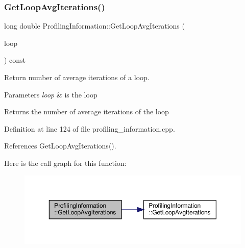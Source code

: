 \subsubsection{\texorpdfstring{Get\+Loop\+Avg\+Iterations()}{GetLoopAvgIterations()}\hspace{0.1cm}{\footnotesize\ttfamily [2/2]}}
{\footnotesize\ttfamily long double Profiling\+Information\+::\+Get\+Loop\+Avg\+Iterations (\begin{DoxyParamCaption}\item[{const Loop\+Const\+Ref}]{loop }\end{DoxyParamCaption}) const}



Return number of average iterations of a loop. 


\begin{DoxyParams}{Parameters}
{\em loop} & is the loop \\
\hline
\end{DoxyParams}
\begin{DoxyReturn}{Returns}
the number of average iterations of the loop 
\end{DoxyReturn}


Definition at line 124 of file profiling\+\_\+information.\+cpp.



References Get\+Loop\+Avg\+Iterations().

Here is the call graph for this function\+:
\nopagebreak
\begin{figure}[H]
\begin{center}
\leavevmode
\includegraphics[width=350pt]{dd/d5b/classProfilingInformation_a29fb3019434a6b893e554dfd8438076f_cgraph}
\end{center}
\end{figure}
\mbox{\label{classProfilingInformation_a840efae2165a4271c99184e088bc38e4}} 

